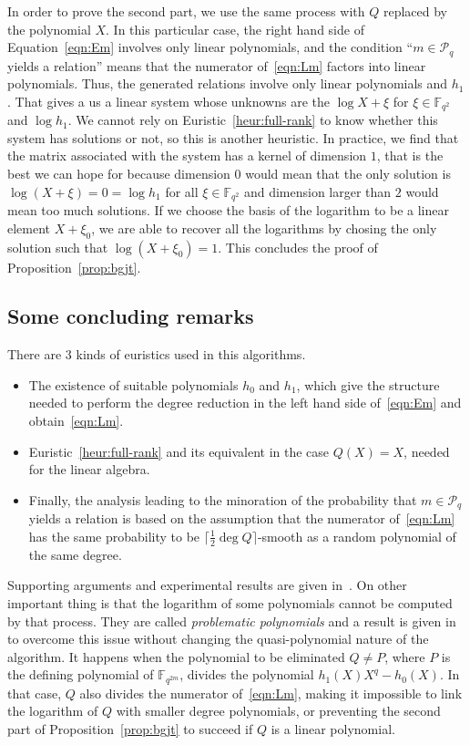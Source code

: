 \documentclass[a4paper,11pt]{article}
\theoremstyle{break}
\theoremstyle{sc}
\theoremstyle{definition}
\theoremstyle{remark}
\begin{document}
In order to prove the second part, we use the same process with $Q$ replaced by the
polynomial $X$. In this particular case, the right hand side of
Equation~\eqref{eqn:Em} involves only linear polynomials, and the condition
``$m\in\mathcal P_q$ yields a relation'' means that the numerator
of~\eqref{eqn:Lm} factors into linear polynomials. Thus, the generated relations
involve only linear polynomials and $h_1$. That gives a us a linear system whose
unknowns are the $\log X+\xi$ for $\xi\in\mathbb{F}_{q^2}$ and $\log h_1$. We
cannot rely on Euristic~\ref{heur:full-rank} to know whether this system has
solutions or not, so this is another heuristic. In practice, we find that the
matrix associated with the system has a kernel of dimension $1$, that is the
best we can hope for because dimension $0$ would mean that the only solution is
$\log (X+\xi)=0=\log h_1$ for all $\xi\in\mathbb{F}_{q^2}$ and dimension larger
than $2$ would mean too much solutions. If we choose the basis of the logarithm
to be a linear element $X+\xi_0$, we are able to recover all the logarithms by
chosing the only solution such that $\log (X+\xi_0)=1$. This concludes the proof
of Proposition~\ref{prop:bgjt}.

\subsection{Some concluding remarks}

There are $3$ kinds of euristics used in this algorithms.
\begin{itemize}
  \item The existence of suitable polynomials $h_0$ and $h_1$, which give the
    structure needed to perform the degree reduction in the left hand side
    of~\eqref{eqn:Em} and obtain~\eqref{eqn:Lm}.
  \item Euristic~\ref{heur:full-rank} and its equivalent in the case
    $Q(X) = X$, needed for the linear algebra.
  \item Finally, the analysis leading to the minoration of the probability that
    $m\in\mathcal P_q$ yields a relation is based on the assumption that the
    numerator of~\eqref{eqn:Lm} has the same probability to be
    $\lceil\frac{1}{2}\deg Q\rceil$-smooth as a random polynomial of the same
    degree.
\end{itemize}
Supporting arguments and experimental results are given in~\cite{BGJT13}. On
other important thing is that the logarithm of some polynomials cannot
be computed by that process. They are called \emph{problematic polynomials} and
a result is given in~\cite{BGJT13} to overcome this issue without changing the
quasi-polynomial nature of the algorithm. It happens when the polynomial to be
eliminated $Q\neq P$, where $P$ is the defining polynomial of
$\mathbb{F}_{q^{2m}}$, divides the polynomial $h_1(X)X^q-h_0(X)$. In that case,
$Q$ also divides the numerator of~\eqref{eqn:Lm}, making it impossible to link
the logarithm of $Q$ with smaller degree polynomials, or preventing the second
part of Proposition~\ref{prop:bgjt} to succeed if $Q$ is a linear polynomial.
\end{document}
